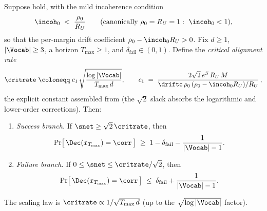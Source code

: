 \begin{theorem}
\label{thm:R1}
Suppose  hold, with the mild
incoherence condition
\begin{align}\label{eq:R1_incoherence}
   \incoh_0 \;<\; \frac{\rho_0}{R_U}
   \qquad(\text{canonically }\rho_0=R_U=1:\ \incoh_0<1),
\end{align}
so that the per-margin drift coefficient $\rho_0-\incoh_0 R_U>0$. Fix
$d\ge1$, $|\Vocab|\ge3$, a horizon $T_{\max}\ge1$, and
$\delta_{\mathrm{fail}}\in(0,1)$. Define the \emph{critical alignment rate}
\begin{align}\label{eq:critical_rate}
   \critrate
   \;\coloneqq\;
   c_1\,\sqrt{\frac{\log|\Vocab|}{T_{\max}\,d}},
   \qquad
   c_1 \;=\; \frac{2\sqrt2\,e^{S}\,R_U\,M}{\driftc\,\rho_0\,(\rho_0-\incoh_0 R_U)/R_U}\,,
\end{align}
the explicit constant assembled from
(the $\sqrt2$ slack absorbs the logarithmic and lower-order corrections).
Then:
\begin{enumerate}[label=(\roman*),leftmargin=2em,itemsep=0.2em]
\item \emph{Success branch.} If $\snet\ge\sqrt2\,\critrate$, then
       \begin{align}\label{eq:R1_success}
          \Pr\bigl[\, \Dec(x_{T_{\max}})=\corr \,\bigr]
          \;\ge\;
          1 - \delta_{\mathrm{fail}} - \frac{1}{|\Vocab|-1}.
       \end{align}
\item \emph{Failure branch.} If $0\le\snet\le\critrate/\sqrt2$, then
       \begin{align}\label{eq:R1_failure}
          \Pr\bigl[\, \Dec(x_{T_{\max}})=\corr \,\bigr]
          \;\le\;
          \delta_{\mathrm{fail}} + \frac{1}{|\Vocab|-1}.
       \end{align}
\end{enumerate}
The scaling law is $\critrate\propto1/\sqrt{T_{\max}\,d}$ (up to the
$\sqrt{\log|\Vocab|}$ factor).
\end{theorem}

